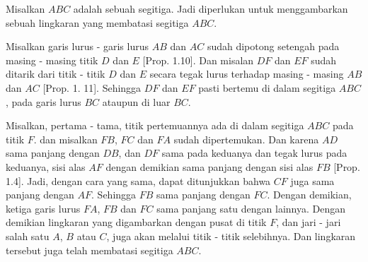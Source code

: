 \documentclass[a4paper]{book}
\begin{document}
\begin{center}
\end{center}
Misalkan $ABC$ adalah sebuah segitiga. Jadi diperlukan untuk menggambarkan
sebuah lingkaran yang membatasi segitiga $ABC$.

Misalkan garis lurus - garis lurus $AB$ dan $AC$ sudah dipotong setengah pada
masing - masing titik $D$ dan $E$ [Prop. 1.10]. Dan misalan $DF$ dan $EF$ sudah
ditarik dari titik - titik $D$ dan $E$ secara tegak lurus terhadap masing - 
masing $AB$ dan $AC$ [Prop. 1. 11]. Sehingga $DF$ dan $EF$ pasti bertemu di 
dalam segitiga $ABC$, pada garis lurus $BC$ ataupun di luar $BC$.

Misalkan, pertama - tama, titik pertemuannya ada di dalam segitiga $ABC$ pada
titik $F$. dan misalkan $FB$, $FC$ dan $FA$ sudah dipertemukan. Dan karena
$AD$ sama panjang dengan $DB$, dan $DF$ sama pada keduanya dan tegak lurus pada keduanya,
sisi alas $AF$ dengan demikian sama panjang dengan sisi alas $FB$ [Prop. 1.4].
Jadi, dengan cara yang sama, dapat ditunjukkan bahwa $CF$ juga sama panjang 
dengan  $AF$. Sehingga $FB$ sama panjang dengan $FC$. Dengan demikian, ketiga
garis lurus $FA$, $FB$ dan $FC$ sama panjang satu dengan lainnya. Dengan 
demikian lingkaran yang digambarkan dengan pusat di titik $F$, dan jari - jari 
salah satu $A$, $B$ atau $C$, juga akan melalui titik - titik selebihnya. Dan 
lingkaran tersebut juga telah membatasi segitiga $ABC$.
\end{document}
